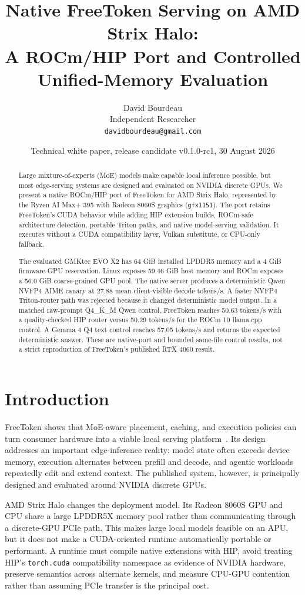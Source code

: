 \documentclass[10pt,letterpaper,twocolumn]{article}
\title{Native FreeToken Serving on AMD Strix Halo:\\A ROCm/HIP Port and Controlled Unified-Memory Evaluation}
\author{David Bourdeau\\Independent Researcher\\\texttt{davidbourdeau@gmail.com}}
\date{Technical white paper, release candidate v0.1.0-rc1, 30 August 2026}
\begin{document}
\maketitle

\begin{abstract}
Large mixture-of-experts (MoE) models make capable local inference possible, but most edge-serving systems are designed and evaluated on NVIDIA discrete GPUs. We present a native ROCm/HIP port of FreeToken for AMD Strix Halo, represented by the Ryzen AI Max+ 395 with Radeon 8060S graphics (\texttt{gfx1151}). The port retains FreeToken's CUDA behavior while adding HIP extension builds, ROCm-safe architecture detection, portable Triton paths, and native model-serving validation. It executes without a CUDA compatibility layer, Vulkan substitute, or CPU-only fallback.

The evaluated GMKtec EVO X2 has 64 GiB installed LPDDR5 memory and a 4 GiB firmware GPU reservation. Linux exposes 59.46 GiB host memory and ROCm exposes a 56.0 GiB coarse-grained GPU pool. The native server produces a deterministic Qwen NVFP4 AIME canary at 27.88 mean client-visible decode tokens/s. A faster NVFP4 Triton-router path was rejected because it changed deterministic model output. In a matched raw-prompt Q4\_K\_M Qwen control, FreeToken reaches 50.63 tokens/s with a quality-checked HIP router versus 50.29 tokens/s for the ROCm 10 llama.cpp control. A Gemma 4 Q4 text control reaches 57.05 tokens/s and returns the expected deterministic answer. These are native-port and bounded same-file control results, not a strict reproduction of FreeToken's published RTX 4060 result.
\end{abstract}

\section{Introduction}

FreeToken shows that MoE-aware placement, caching, and execution policies can turn consumer hardware into a viable local serving platform~\cite{freetoken}. Its design addresses an important edge-inference reality: model state often exceeds device memory, execution alternates between prefill and decode, and agentic workloads repeatedly edit and extend context. The published system, however, is principally designed and evaluated around NVIDIA discrete GPUs.

AMD Strix Halo changes the deployment model. Its Radeon 8060S GPU and CPU share a large LPDDR5X memory pool rather than communicating through a discrete-GPU PCIe path. This makes large local models feasible on an APU, but it does not make a CUDA-oriented runtime automatically portable or performant. A runtime must compile native extensions with HIP, avoid treating HIP's \texttt{torch.cuda} compatibility namespace as evidence of NVIDIA hardware, preserve semantics across alternate kernels, and measure CPU-GPU contention rather than assuming PCIe transfer is the principal cost.
\end{document}
